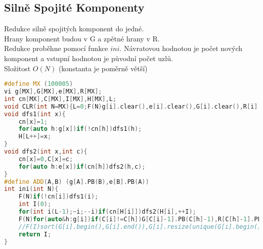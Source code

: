\documentclass[11pt]{article}
\begin{document}
\subsection{Silně Spojité Komponenty}
Redukce silně spojitých komponent do jedné.
\\Hrany komponent budou v \textsf{G} a zpětné hrany v \textsf{R}.
\\Redukce proběhne pomocí funkce $ini$. Návratovou hodnotou je počet nových komponent a vstupní hodnotou je původní počet uzlů.
\\Složitost $O(N)$ (konstanta je poměrně větší)
\begin{lstlisting}[language=C++]
#define MX (100005)
vi g[MX],G[MX],e[MX],R[MX];
int cn[MX],C[MX],I[MX],H[MX],L;
void CLR(int N=MX){L=0;F(N)g[i].clear(),e[i].clear(),G[i].clear(),R[i].clear(),cn[i]=I[i]=0;}
void dfs1(int x){
    cn[x]=1;
    for(auto h:g[x])if(!cn[h])dfs1(h);
    H[L++]=x;
}
void dfs2(int x,int c){
    cn[x]=0,C[x]=c;
    for(auto h:e[x])if(cn[h])dfs2(h,c);
}
#define ADD(A,B) (g[A].PB(B),e[B].PB(A))
int ini(int N){
    F(N)if(!cn[i])dfs1(i);
    int I(0);
    for(int i(L-1);~i;--i)if(cn[H[i]])dfs2(H[i],++I);
    F(N)for(auto&h:g[i])if(C[i]!=C[h])G[C[i]-1].PB(C[h]-1),R[C[h]-1].PB(C[i]-1);
    //F(I)sort(G[i].begin(),G[i].end()),G[i].resize(unique(G[i].begin(),G[i].end())-G[i].begin());
    return I;
}
\end{lstlisting}
\end{document}
